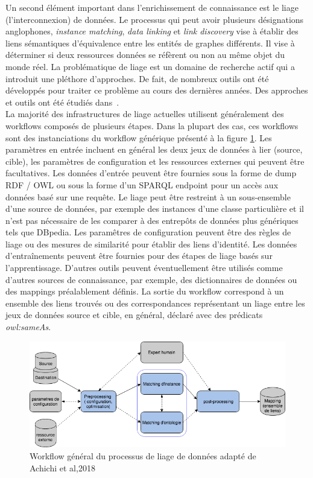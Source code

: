 Un second élément important dans l’enrichissement de connaissance est le liage (l’interconnexion) de données. Le processus qui peut avoir plusieurs désignations anglophones, \textit{instance matching}, \textit{data linking} et \textit{link discovery} vise à établir des liens sémantiques d’équivalence entre les entités de graphes différents. Il vise à déterminer si deux ressources données se réfèrent ou non au même objet du monde réel. La problématique de liage est un domaine de recherche actif qui a introduit une pléthore d'approches. De fait, de nombreux outils ont été développés pour traiter ce problème au cours des dernières années. Des approches et outils ont été étudiés dans~\cite{ferrara2011,Achichi2016,erv271}. \\
La majorité des infrastructures de liage actuelles utilisent généralement des workflows composés de plusieurs étapes. Dans la plupart des cas, ces workflows sont des instanciations du workflow générique présenté à la figure \ref{liage1}. Les paramètres en entrée incluent en général les deux jeux de données à lier (source, cible), les paramètres de configuration et les ressources externes qui peuvent être facultatives. Les données d'entrée peuvent être fournies sous la forme de dump RDF / OWL ou sous la forme d'un SPARQL endpoint pour un accès aux données basé sur une requête. Le liage peut être restreint à un sous-ensemble d'une source de données, par exemple des instances d'une classe particulière et il n'est pas nécessaire de les comparer à des entrepôts de données plus génériques tels que DBpedia. Les paramêtres de configuration peuvent être des règles de liage ou des mesures de similarité pour établir des liens d'identité. Les données d'entraînements peuvent être fournies pour des étapes de liage basés sur l'apprentissage. D'autres outils peuvent éventuellement être utilisés comme d'autres sources de connaissance, par exemple, des dictionnaires de données ou des mappings préalablement définis. La sortie du workflow correspond à un ensemble des liens trouvés ou des correspondances représentant un liage entre les jeux de données source et cible, en général, déclaré avec des prédicats \textit{owl:sameAs}.


\begin{figure}[!ht]
\begin{center}
	\includegraphics[width=1\textwidth]{Figures/liage.png}
\end{center}
\label{liage1}
\caption[ Workflow général du processus de liage de données]{ Workflow général du processus de liage de données adapté de Achichi et al,2018~\cite{erv271} }
\end{figure}

